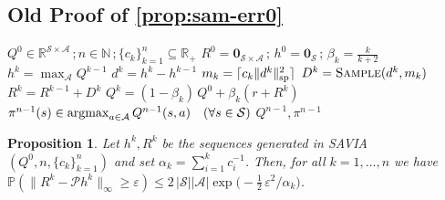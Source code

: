 \documentclass{article}
\newcommand{\Argmax}{\mathop{\rm argmax}}
\newcommand{\cA}{\mathcal{A}}
\newcommand{\cS}{\mathcal{S}}
\newcommand{\cP}{\mathcal{P} }
\newcommand{\prob}{\mathbb{P}}
\newcommand{\real}{\mathbb{R}}
\newcommand{\NN}{\mathbb{N}}
\newcommand{\reals}{\mathbb{R}}
\renewcommand{\sp}[1]{\|{#1}\|_\text{\rm sp}}
\newcommand{\maxA}{\mbox{$\max_\cA$}}
\theoremstyle{plain}
\newtheorem{proposition}[theorem]{Proposition}
\theoremstyle{definition}
\theoremstyle{remark}
\begin{document}
\iffalse
\newpage 
\subsection{Old Proof of \cref{prop:sam-err0}}

\begin{algorithm}[ht!]
   \caption{\mbox{\rm SAVIA}$(Q^0,n,\{c_k\}_{k=1}^n)$}
   \label{alg:example_old}
\begin{algorithmic}
      $Q^{0}\!\in\real^{\cS\times\cA}$\,;\,$n\in\NN$\,;\,$\{c_k\}_{k=1}^n\subseteq \reals_+$
    $R^{0} \!=\mathbf{0}_{\cS\times\cA}\,;\, h^{0}\! =\mathbf{0}_{\cS}\,;\,  \beta_k\!=\! \frac{k}{k+2}$  
     \STATE $h^k= \maxA Q^{k-1}$
     \STATE $d^k=h^k-h^{k-1}$
    \STATE $m_k= \lceil c_k\sp{d^k}^2\rceil$
     \STATE $D^k = \mbox{\sc Sample}(d^k, m_k)$ 
     \STATE $R^k = R^{k-1}+D^k$ 
     \STATE $Q^{k} =(1\!-\!\beta_k)\,Q^0+\beta_k (r+R^k)$
   \ENDFOR
   \STATE $\pi^{n-1}(s) \in \Argmax_{a\in \cA} Q^{n-1}(s,a)\quad(\forall s\in\cS)$
    $Q^{n-1} , \pi^{n-1} $ 
\end{algorithmic}
\end{algorithm}


\begin{proposition}\label{prop:sam-err01}
Let $h^k,R^k$ be the sequences generated in \mbox{\rm SAVIA}$(Q^0,n, \{c_k\}^n_{k=1})$ and set $\alpha_k=\sum_{i=1}^k\!c_i^{-1}$.
Then, for all $k=1,\ldots,n$ we have
 $\prob(\|R^k-\cP h^k\|_\infty\ge  \varepsilon)\le 2\,|\cS||\cA|\exp\big(\!-\mbox{$\frac{1}{2}$}\,\varepsilon^2/\alpha_k\big)$. 
\end{proposition}
\end{document}
